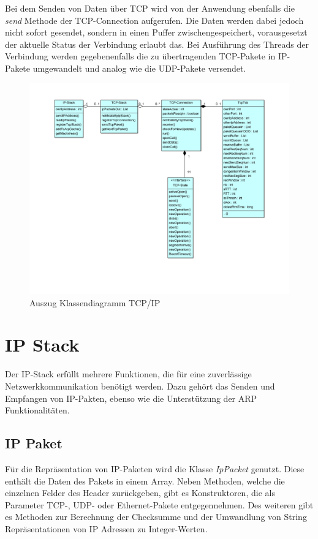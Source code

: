 Bei dem Senden von Daten über TCP wird von der Anwendung ebenfalls die \textit{send} Methode der TCP-Connection aufgerufen. Die Daten werden dabei jedoch nicht sofort gesendet, sondern in einen Puffer zwischengespeichert, vorausgesetzt der aktuelle Status der Verbindung erlaubt das. Bei Ausführung des Threads der Verbindung werden gegebenenfalls die zu übertragenden TCP-Pakete in IP-Pakete umgewandelt und analog wie die UDP-Pakete versendet. 


\begin{figure}[h]
	\centering
	\includegraphics[width=1\textwidth]{Graphics/TCPStack.png}
	\caption{Auszug Klassendiagramm TCP/IP}		
\end{figure}


\section{IP Stack}
Der IP-Stack erfüllt mehrere Funktionen, die für eine zuverlässige Netzwerkkommunikation benötigt werden. Dazu gehört das Senden und Empfangen von IP-Pakten, ebenso wie die Unterstützung der ARP Funktionalitäten.

\subsection{IP Paket}
Für die Repräsentation von IP-Paketen wird die Klasse \textit{IpPacket} genutzt. Diese enthält die Daten des Pakets in einem Array. Neben Methoden, welche die einzelnen Felder des Header zurückgeben, gibt es Konstruktoren, die als Parameter TCP-, UDP- oder Ethernet-Pakete entgegennehmen. Des weiteren gibt es Methoden zur Berechnung der Checksumme und der Umwandlung von String Repräsentationen von IP Adressen zu Integer-Werten.  

